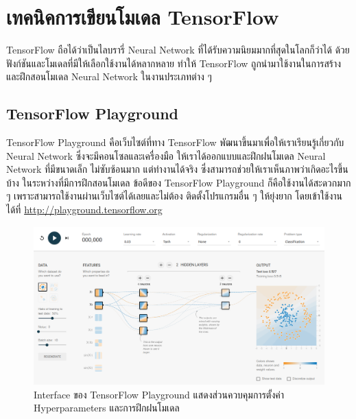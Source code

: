 

\chapter{เทคนิคการเขียนโมเดล TensorFlow}
\label{ch:coding_tf}

TensorFlow ถือได้ว่าเป็นไลบรารี่ Neural Network ที่ได้รับความนิยมมากที่สุดในโลกก็ว่าได้ ด้วยฟังก์ชันและโมเดลที่มีให้เลือกใช้งานได้หลากหลาย
ทำให้ TensorFlow ถูกนำมาใช้งานในการสร้างและฝึกสอนโมเดล Neural Network ในงานประเภทต่าง ๆ

\section{TensorFlow Playground}
\label{sec:tf_playground}

TensorFlow Playground คือเว็บไซต์ที่ทาง TensorFlow พัฒนาขึ้นมาเพื่อให้เราเรียนรู้เกี่ยวกับ Neural Network ซึ่งจะมีคอนโซลและเครื่องมือ%
ให้เราได้ออกแบบและฝึกฝนโมเดล Neural Network ที่มีขนาดเล็ก ไม่ซับซ้อนมาก แต่ทำงานได้จริง ซึ่งสามารถช่วยให้เราเห็นภาพว่าเกิดอะไรขึ้นบ้าง%
ในระหว่างที่มีการฝึกสอนโมเดล ข้อดีของ TensorFlow Playground ก็คือใช้งานได้สะดวกมาก ๆ เพราะสามารถใช้งานผ่านเว็บไซต์ได้เลยและไม่ต้อง%
ติดตั้งโปรแกรมอื่น ๆ ให้ยุ่งยาก โดยเข้าใช้งานได้ที่ \url{http://playground.tensorflow.org}

\begin{figure}[htbp]
    \centering
    \includegraphics[width=\linewidth]{fig/tf-playground.png}
    \caption{Interface ของ TensorFlow Playground แสดงส่วนควบคุมการตั้งค่า Hyperparameters และการฝึกฝนโมเดล}
    \label{fig:tf_playground}
\end{figure}

